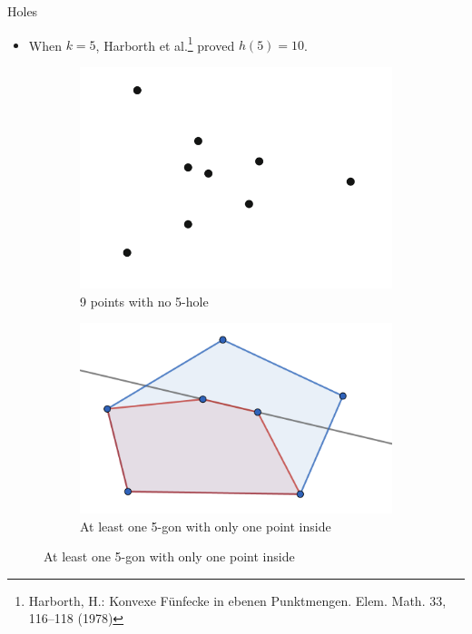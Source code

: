 \documentclass{beamer}
\begin{document}
\begin{frame}{Holes}
    
\begin{itemize}
\item 
When $k=5$, Harborth et al.\footnote{Harborth, H.: Konvexe Fünfecke in ebenen Punktmengen. Elem. Math. 33, 116–118 (1978)} proved $h(5)=10$.

\end{itemize}

\begin{figure}
    \centering
    
\end{figure}


\begin{figure}
\centering
    \begin{subfigure}[t]{0.45\textwidth}
        \includegraphics[width=\linewidth]{h5.png}
        \caption{9 points with no 5-hole}
        \label{fig5h}
    \end{subfigure}
    \begin{subfigure}[t]{0.5\textwidth}
        \includegraphics[width=\textwidth]{5gon-1.png}
        \caption{At least one 5-gon with only one point inside}
        \label{fig5gon1}
    \end{subfigure}
\label{figk5}
\end{figure}


\end{frame}
\end{document}
